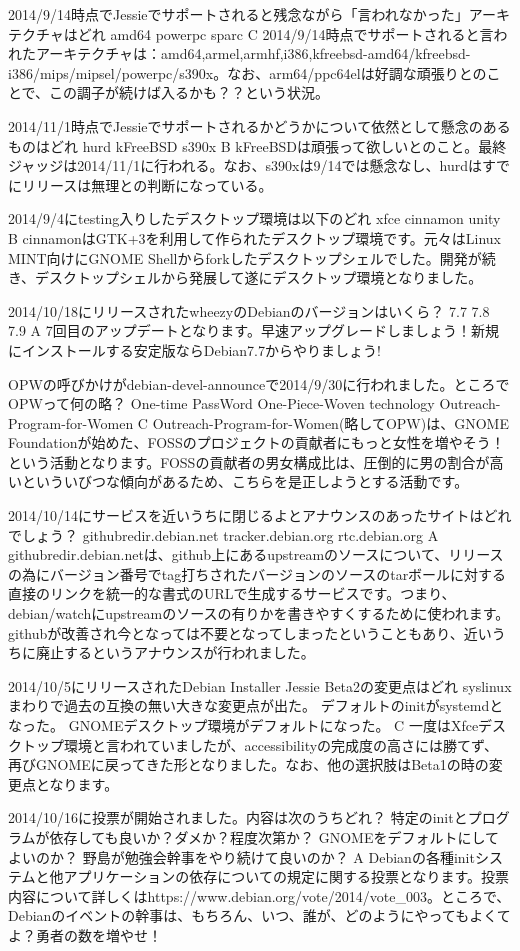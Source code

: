 %

\santaku
{2014/9/14時点でJessieでサポートされると残念ながら「言われなかった」アーキテクチャはどれ}
{amd64}
{powerpc}
{sparc}
{C}
{2014/9/14時点でサポートされると言われたアーキテクチャは：amd64,armel,armhf,i386,kfreebsd-amd64/kfreebsd-i386/mips/mipsel/powerpc/s390x。なお、arm64/ppc64elは好調な頑張りとのことで、この調子が続けば入るかも？？という状況。}

\santaku
{2014/11/1時点でJessieでサポートされるかどうかについて依然として懸念のあるものはどれ}
{hurd}
{kFreeBSD}
{s390x}
{B}
{kFreeBSDは頑張って欲しいとのこと。最終ジャッジは2014/11/1に行われる。なお、s390xは9/14では懸念なし、hurdはすでにリリースは無理との判断になっている。}

\santaku
{2014/9/4にtesting入りしたデスクトップ環境は以下のどれ}
{xfce}
{cinnamon}
{unity}
{B}
{cinnamonはGTK+3を利用して作られたデスクトップ環境です。元々はLinux MINT向けにGNOME Shellからforkしたデスクトップシェルでした。開発が続き、デスクトップシェルから発展して遂にデスクトップ環境となりました。}

\santaku
{2014/10/18にリリースされたwheezyのDebianのバージョンはいくら？}
{7.7}
{7.8}
{7.9}
{A}
{7回目のアップデートとなります。早速アップグレードしましょう！新規にインストールする安定版ならDebian7.7からやりましょう!}

\santaku
{OPWの呼びかけがdebian-devel-announceで2014/9/30に行われました。ところでOPWって何の略？}
{One-time PassWord}
{One-Piece-Woven technology}
{Outreach-Program-for-Women}
{C}
{Outreach-Program-for-Women(略してOPW)は、GNOME Foundationが始めた、FOSSのプロジェクトの貢献者にもっと女性を増やそう！という活動となります。FOSSの貢献者の男女構成比は、圧倒的に男の割合が高いといういびつな傾向があるため、こちらを是正しようとする活動です。}

\santaku
{2014/10/14にサービスを近いうちに閉じるよとアナウンスのあったサイトはどれでしょう？}
{githubredir.debian.net}
{tracker.debian.org}
{rtc.debian.org}
{A}
{githubredir.debian.netは、github上にあるupstreamのソースについて、リリースの為にバージョン番号でtag打ちされたバージョンのソースのtarボールに対する直接のリンクを統一的な書式のURLで生成するサービスです。つまり、debian/watchにupstreamのソースの有りかを書きやすくするために使われます。githubが改善され今となっては不要となってしまったということもあり、近いうちに廃止するというアナウンスが行われました。}

\santaku
{2014/10/5にリリースされたDebian Installer Jessie Beta2の変更点はどれ}
{syslinuxまわりで過去の互換の無い大きな変更点が出た。}
{デフォルトのinitがsystemdとなった。}
{GNOMEデスクトップ環境がデフォルトになった。}
{C}
{一度はXfceデスクトップ環境と言われていましたが、accessibilityの完成度の高さには勝てず、再びGNOMEに戻ってきた形となりました。なお、他の選択肢はBeta1の時の変更点となります。}

\santaku
{2014/10/16に投票が開始されました。内容は次のうちどれ？}
{特定のinitとプログラムが依存しても良いか？ダメか？程度次第か？}
{GNOMEをデフォルトにしてよいのか？}
{野島が勉強会幹事をやり続けて良いのか？}
{A}
{Debianの各種initシステムと他アプリケーションの依存についての規定に関する投票となります。投票内容について詳しくはhttps://www.debian.org/vote/2014/vote\_003。ところで、Debianのイベントの幹事は、もちろん、いつ、誰が、どのようにやってもよくてよ？勇者の数を増やせ！}









